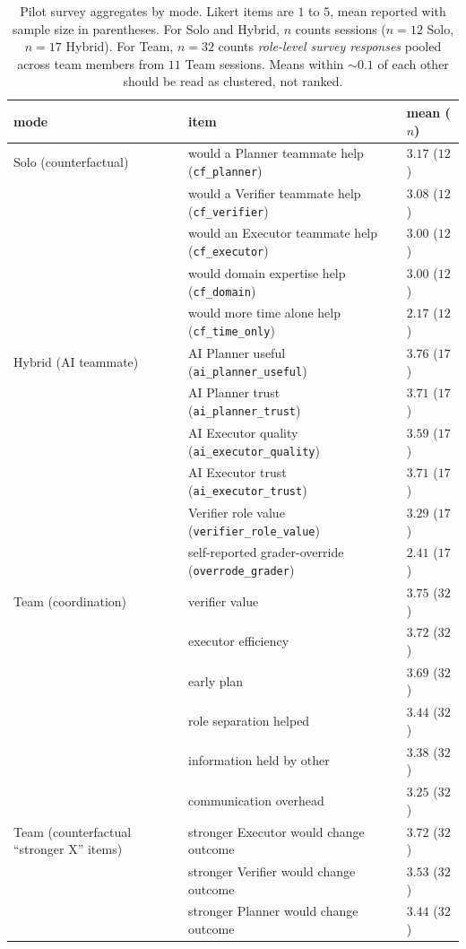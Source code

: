 \documentclass{article}
\begin{document}
\begin{table}[h]
\centering
\small
\caption{Pilot survey aggregates by mode. Likert items are $1$ to $5$, mean reported with sample size in parentheses. For Solo and Hybrid, $n$ counts sessions ($n=12$ Solo, $n=17$ Hybrid). For Team, $n=32$ counts \emph{role-level survey responses} pooled across team members from $11$ Team sessions. Means within $\sim 0.1$ of each other should be read as clustered, not ranked.}
\label{tab:human-pilot-surveys}
\begin{tabular}{lll}
\toprule
mode & item & mean ($n$) \\
\midrule
Solo (counterfactual)
& would a Planner teammate help (\texttt{cf\_planner})    & $3.17$ ($12$) \\
& would a Verifier teammate help (\texttt{cf\_verifier})  & $3.08$ ($12$) \\
& would an Executor teammate help (\texttt{cf\_executor}) & $3.00$ ($12$) \\
& would domain expertise help (\texttt{cf\_domain})       & $3.00$ ($12$) \\
& would more time alone help (\texttt{cf\_time\_only})    & $2.17$ ($12$) \\
\midrule
Hybrid (AI teammate)
& AI Planner useful (\texttt{ai\_planner\_useful})        & $3.76$ ($17$) \\
& AI Planner trust (\texttt{ai\_planner\_trust})          & $3.71$ ($17$) \\
& AI Executor quality (\texttt{ai\_executor\_quality})    & $3.59$ ($17$) \\
& AI Executor trust (\texttt{ai\_executor\_trust})        & $3.71$ ($17$) \\
& Verifier role value (\texttt{verifier\_role\_value})    & $3.29$ ($17$) \\
& self-reported grader-override (\texttt{overrode\_grader}) & $2.41$ ($17$) \\
\midrule
Team (coordination)
& verifier value                                          & $3.75$ ($32$) \\
& executor efficiency                                     & $3.72$ ($32$) \\
& early plan                                              & $3.69$ ($32$) \\
& role separation helped                                  & $3.44$ ($32$) \\
& information held by other                               & $3.38$ ($32$) \\
& communication overhead                                  & $3.25$ ($32$) \\
\midrule
Team (counterfactual ``stronger X'' items)
& stronger Executor would change outcome                  & $3.72$ ($32$) \\
& stronger Verifier would change outcome                  & $3.53$ ($32$) \\
& stronger Planner would change outcome                   & $3.44$ ($32$) \\
\bottomrule
\end{tabular}
\end{table}
\end{document}
